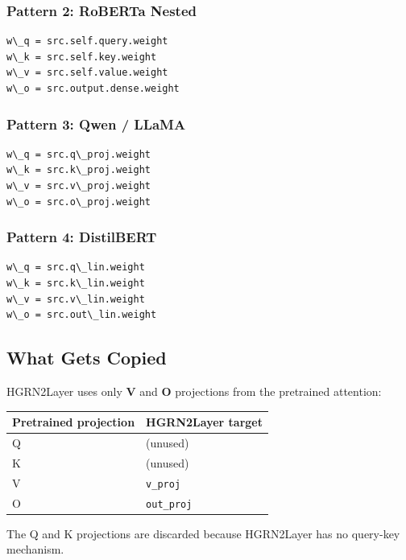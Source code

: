 \subsubsection{Pattern 2: RoBERTa Nested}

\begin{lstlisting}
w\_q = src.self.query.weight
w\_k = src.self.key.weight
w\_v = src.self.value.weight
w\_o = src.output.dense.weight
\end{lstlisting}

\subsubsection{Pattern 3: Qwen / LLaMA}

\begin{lstlisting}
w\_q = src.q\_proj.weight
w\_k = src.k\_proj.weight
w\_v = src.v\_proj.weight
w\_o = src.o\_proj.weight
\end{lstlisting}

\subsubsection{Pattern 4: DistilBERT}

\begin{lstlisting}
w\_q = src.q\_lin.weight
w\_k = src.k\_lin.weight
w\_v = src.v\_lin.weight
w\_o = src.out\_lin.weight
\end{lstlisting}

\subsection{What Gets Copied}

HGRN2Layer uses only \textbf{V} and \textbf{O} projections from the pretrained attention:

\begin{table}[H]
\centering
\small
\begin{tabular}{ll}
\toprule
\textbf{Pretrained projection} & \textbf{HGRN2Layer target} \\
\midrule
Q & (unused) \\
K & (unused) \\
V & \texttt{v\_proj} \\
O & \texttt{out\_proj} \\
\bottomrule
\end{tabular}
\end{table}

The Q and K projections are discarded because HGRN2Layer has no query-key 
mechanism.

